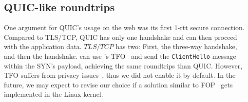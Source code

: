 \subsection{QUIC-like roundtrips}

One argument for QUIC's usage on the web was its first 1-rtt secure connection.
Compared to TLS/TCP, QUIC has only one handshake and can then proceed with the
application data. $TLS/TCP$ has two: First, the \tcp three-way handshake, and
then the \tls handshake. \tcpls can use \tcp's TFO~\cite{radhakrishnan2011tcp}
and send the \texttt{ClientHello} message within the \tcp SYN's payload,
achieving the same roundtrips than QUIC. However, TFO suffers from privacy
issues~\cite{sy2020enhanced}, thus we did not enable it by default. In the
future, we may expect to revise our choice if a solution similar to \tcp
FOP~\cite{sy2020enhanced} gets implemented in the Linux kernel.


